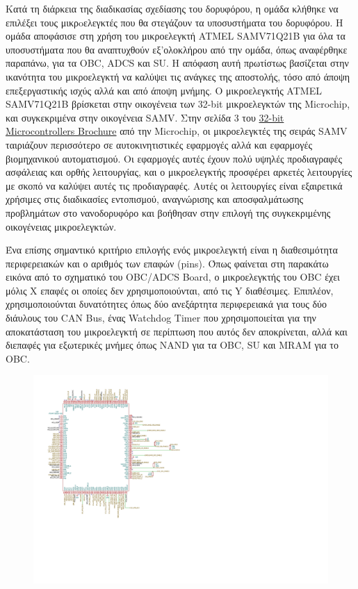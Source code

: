 \documentclass[a4paper,nobib,justified]{tufte-book}
\begin{document}
Κατά τη διάρκεια της διαδικασίας σχεδίασης του δορυφόρου, η ομάδα κλήθηκε να επιλέξει τους μικρoελεγκτές που θα στεγάζουν τα υποσυστήματα του δορυφόρου. Η ομάδα αποφάσισε στη χρήση του μικροελεγκτή ATMEL SAMV71Q21B για όλα τα υποσυστήματα που θα αναπτυχθούν εξ'ολοκλήρου από την ομάδα, όπως αναφέρθηκε παραπάνω, για τα OBC, ADCS και SU. Η απόφαση αυτή πρωτίστως βασίζεται στην ικανότητα του μικροελεγκτή να καλύψει τις ανάγκες της αποστολής, τόσο από άποψη επεξεργαστικής ισχύς αλλά και από άποψη μνήμης. Ο μικροελεγκτής ATMEL SAMV71Q21B βρίσκεται στην οικογένεια των 32-bit μικροελεγκτών της Microchip, και συγκεκριμένα στην οικογένεια SAMV. Στην σελίδα 3 του \href{https://ww1.microchip.com/downloads/en/DeviceDoc/30009904V.pdf}{32-bit Microcontrollers Brochure} από την Microchip, οι μικροελεγκτές της σειράς SAMV ταιριάζουν περισσότερο σε αυτοκινητιστικές εφαρμογές αλλά και εφαρμογές βιομηχανικού αυτοματισμού. Οι εφαρμογές αυτές έχουν πολύ υψηλές προδιαγραφές ασφάλειας και ορθής λειτουργίας, και ο μικροελεγκτής προσφέρει αρκετές λειτουργίες με σκοπό να καλύψει αυτές τις προδιαγραφές. Αυτές οι λειτουργίες είναι εξαιρετικά χρήσιμες στις διαδικασίες εντοπισμού, αναγνώρισης και αποσφαλμάτωσης προβλημάτων στο νανοδορυφόρο και βοήθησαν στην επιλογή της συγκεκριμένης οικογένειας μικροελεγκτών.

Ένα επίσης σημαντικό κριτήριο επιλογής ενός μικροελεγκτή είναι η διαθεσιμότητα περιφερειακών και ο αριθμός των επαφών (pins). Όπως φαίνεται στη παρακάτω εικόνα από το σχηματικό του OBC/ADCS Board, ο μικροελεγκτής του OBC έχει μόλις X επαφές οι οποίες δεν χρησιμοποιούνται, από τις Y διαθέσιμες. Επιπλέον, χρησιμοποιούνται δυνατότητες όπως δύο ανεξάρτητα περιφερειακά για τους δύο διάυλους του CAN Bus, ένας Watchdog Timer που χρησιμοποιείται για την αποκατάσταση του μικροελεγκτή σε περίπτωση που αυτός δεν αποκρίνεται, αλλά και διεπαφές για εξωτερικές μνήμες όπως NAND για τα OBC, SU και MRAM για το OBC.  %
\begin{figure}[ht]
	\includegraphics{media/diagrams/obc-mcu-schematic.pdf}
\end{figure}
\end{document}
